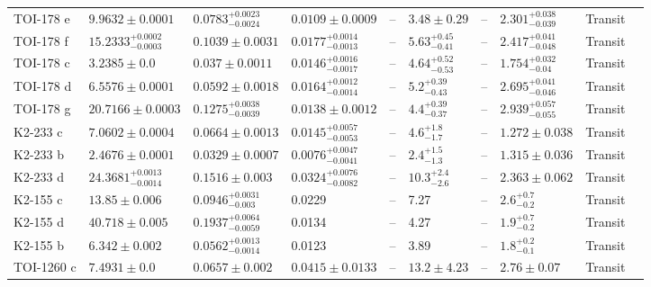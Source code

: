 \begin{tabular}{llllllllll}
TOI-178 e & $9.9632 \pm 0.0001$ & $0.0783^{+0.0023}_{-0.0024}$ & $0.0109 \pm 0.0009$ & -- & $3.48 \pm 0.29$ & -- & $2.301^{+0.038}_{-0.039}$ & Transit & \cite{LELEU_ET_AL__2024} \\
TOI-178 f & $15.2333^{+0.0002}_{-0.0003}$ & $0.1039 \pm 0.0031$ & $0.0177^{+0.0014}_{-0.0013}$ & -- & $5.63^{+0.45}_{-0.41}$ & -- & $2.417^{+0.041}_{-0.048}$ & Transit & \cite{LELEU_ET_AL__2024} \\
TOI-178 c & $3.2385 \pm 0.0$ & $0.037 \pm 0.0011$ & $0.0146^{+0.0016}_{-0.0017}$ & -- & $4.64^{+0.52}_{-0.53}$ & -- & $1.754^{+0.032}_{-0.04}$ & Transit & \cite{LELEU_ET_AL__2024} \\
TOI-178 d & $6.5576 \pm 0.0001$ & $0.0592 \pm 0.0018$ & $0.0164^{+0.0012}_{-0.0014}$ & -- & $5.2^{+0.39}_{-0.43}$ & -- & $2.695^{+0.041}_{-0.046}$ & Transit & \cite{LELEU_ET_AL__2024} \\
TOI-178 g & $20.7166 \pm 0.0003$ & $0.1275^{+0.0038}_{-0.0039}$ & $0.0138 \pm 0.0012$ & -- & $4.4^{+0.39}_{-0.37}$ & -- & $2.939^{+0.057}_{-0.055}$ & Transit & \cite{LELEU_ET_AL__2024} \\
K2-233 c & $7.0602 \pm 0.0004$ & $0.0664 \pm 0.0013$ & $0.0145^{+0.0057}_{-0.0053}$ & -- & $4.6^{+1.8}_{-1.7}$ & -- & $1.272 \pm 0.038$ & Transit & \cite{BARRAG_AMP_AACUTE_N_ET_AL__2023} \\
K2-233 b & $2.4676 \pm 0.0001$ & $0.0329 \pm 0.0007$ & $0.0076^{+0.0047}_{-0.0041}$ & -- & $2.4^{+1.5}_{-1.3}$ & -- & $1.315 \pm 0.036$ & Transit & \cite{BARRAG_AMP_AACUTE_N_ET_AL__2023} \\
K2-233 d & $24.3681^{+0.0013}_{-0.0014}$ & $0.1516 \pm 0.003$ & $0.0324^{+0.0076}_{-0.0082}$ & -- & $10.3^{+2.4}_{-2.6}$ & -- & $2.363 \pm 0.062$ & Transit & \cite{BARRAG_AMP_AACUTE_N_ET_AL__2023} \\
K2-155 c & $13.85 \pm 0.006$ & $0.0946^{+0.0031}_{-0.003}$ & 0.0229 & -- & 7.27 & -- & $2.6^{+0.7}_{-0.2}$ & Transit & \cite{D_IACUTE_EZ_ALONSO_ET_AL__2018} \\
K2-155 d & $40.718 \pm 0.005$ & $0.1937^{+0.0064}_{-0.0059}$ & 0.0134 & -- & 4.27 & -- & $1.9^{+0.7}_{-0.2}$ & Transit & \cite{D_IACUTE_EZ_ALONSO_ET_AL__2018} \\
K2-155 b & $6.342 \pm 0.002$ & $0.0562^{+0.0013}_{-0.0014}$ & 0.0123 & -- & 3.89 & -- & $1.8^{+0.2}_{-0.1}$ & Transit & \cite{D_IACUTE_EZ_ALONSO_ET_AL__2018} \\
TOI-1260 c & $7.4931 \pm 0.0$ & $0.0657 \pm 0.002$ & $0.0415 \pm 0.0133$ & -- & $13.2 \pm 4.23$ & -- & $2.76 \pm 0.07$ & Transit & \cite{LAM_ET_AL_2023} \\

\end{tabular}
